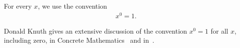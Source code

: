 \begin{convention} For every $x$, we use the convention
  \begin{align*}
    x^0 = 1.
  \end{align*}
\end{convention}
Donald Knuth gives an extensive discussion of the convention $x^0=1$ for
all $x$, including zero, in Concrete Mathematics~\cite[p. 162]{graham1994concrete}
and in~\cite{knuth1992notesnotation}.
